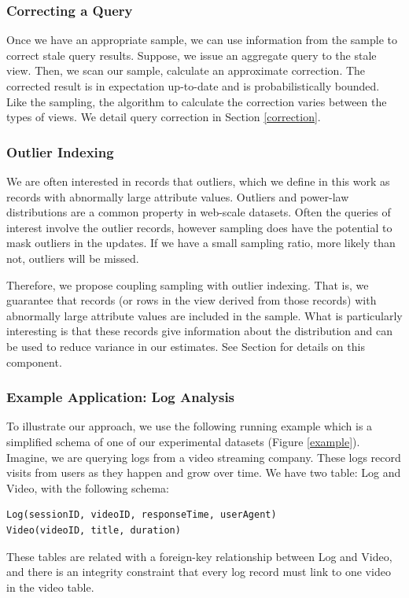\subsubsection{Correcting a Query}
Once we have an appropriate sample, we can use information from the sample to correct stale query results.
Suppose, we issue an aggregate query to the stale view.
Then, we scan our sample, calculate an approximate correction.
The corrected result is in expectation up-to-date and is probabilistically bounded.
Like the sampling, the algorithm to calculate the correction varies between the types of views.
We detail query correction in Section \ref{correction}.

\subsubsection{Outlier Indexing}
We are often interested in records that outliers, 
which we define in this work as records with abnormally large attribute values.
Outliers and power-law distributions are a common property in web-scale datasets.
Often the queries of interest involve the outlier records, however sampling does 
have the potential to mask outliers in the updates.
If we have a small sampling ratio, more likely than not, outliers will be missed.

Therefore, we propose coupling sampling with outlier indexing. 
That is, we guarantee that records (or rows in the view derived from those records) 
with abnormally large attribute values are included in the sample.
What is particularly interesting is that these records give information about the distribution 
and can be used to reduce variance in our estimates.
See Section \label{outlier} for details on this component.

\subsubsection{Example Application: Log Analysis}
To illustrate our approach, we use the following running example which is a 
simplified schema of one of our experimental datasets (Figure \ref{example}).
Imagine, we are querying logs from a video streaming company. 
These logs record visits from users as they happen and grow over time.
We have two table: Log and Video, with the following schema:
\begin{lstlisting}
Log(sessionID, videoID, responseTime, userAgent)
Video(videoID, title, duration)
\end{lstlisting}
These tables are related with a foreign-key relationship between
Log and Video, and there is an integrity constraint that every log
record must link to one video in the video table.

